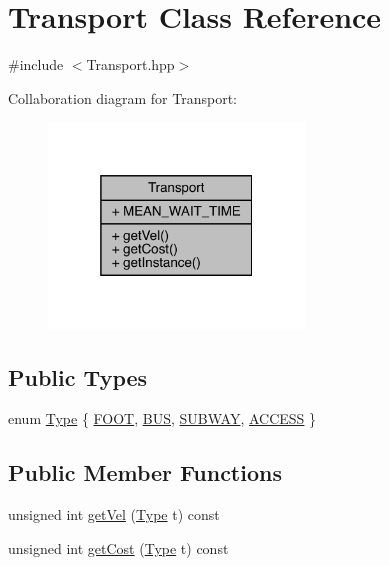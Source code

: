 \hypertarget{class_transport}{}\section{Transport Class Reference}
\label{class_transport}


{\ttfamily \#include $<$Transport.\+hpp$>$}



Collaboration diagram for Transport\+:\nopagebreak
\begin{figure}[H]
\begin{center}
\leavevmode
\includegraphics[width=193pt]{class_transport__coll__graph}
\end{center}
\end{figure}
\subsection*{Public Types}
\begin{DoxyCompactItemize}
\item 
enum \hyperlink{class_transport_a1879cecfed0d4238e5a7af6d085db317}{Type} \{ \hyperlink{class_transport_a1879cecfed0d4238e5a7af6d085db317a9eb45a1db8620c55d48eeee34f09980c}{F\+O\+OT}, 
\hyperlink{class_transport_a1879cecfed0d4238e5a7af6d085db317a03910f9910b1cda89566027b1c4f2740}{B\+US}, 
\hyperlink{class_transport_a1879cecfed0d4238e5a7af6d085db317a1e7a9bb5192d54bdccb9bc99bd35849b}{S\+U\+B\+W\+AY}, 
\hyperlink{class_transport_a1879cecfed0d4238e5a7af6d085db317ae0cc8f327733360f7ccf5abf2b5e7454}{A\+C\+C\+E\+SS}
 \}
\end{DoxyCompactItemize}
\subsection*{Public Member Functions}
\begin{DoxyCompactItemize}
\item 
unsigned int \hyperlink{class_transport_ae9b8f3d27331e429160827194e32bde1}{get\+Vel} (\hyperlink{class_transport_a1879cecfed0d4238e5a7af6d085db317}{Type} t) const
\item 
unsigned int \hyperlink{class_transport_a943eecabe9f2435fcbf2bd3a41a4ea3a}{get\+Cost} (\hyperlink{class_transport_a1879cecfed0d4238e5a7af6d085db317}{Type} t) const
\end{DoxyCompactItemize}
